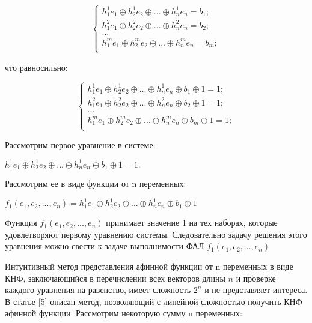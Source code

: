 \documentclass[12pt]{article}
\begin{document}
\[
\begin{cases}
h_{1}^{1}e_{1}\oplus h_{2}^{1}e_{2}\oplus ... \oplus h_{n}^{1}e_{n} = b_{1};  \\
h_{1}^{2}e_{1}\oplus h_{2}^{2}e_{2}\oplus ... \oplus h_{n}^{2}e_{n} = b_{2};  \\
\dots \\
h_{1}^{m}e_{1}\oplus h_{2}^{m}e_{2}\oplus ... \oplus h_{n}^{m}e_{n} = b_{m};  \\
\end{cases}
\]

что равносильно:

\[
\begin{cases}
h_{1}^{1}e_{1}\oplus h_{2}^{1}e_{2}\oplus ... \oplus h_{n}^{1}e_{n} \oplus b_{1}
\oplus 1 = 1;  \\
h_{1}^{2}e_{1}\oplus h_{2}^{2}e_{2}\oplus ... \oplus h_{n}^{2}e_{n} \oplus b_{2} \oplus 1 = 1;  \\
\dots \\
h_{1}^{m}e_{1}\oplus h_{2}^{m}e_{2}\oplus ... \oplus h_{n}^{m}e_{n} \oplus b_{m} \oplus 1 = 1;  \\
\end{cases}
\]

Рассмотрим первое уравнение в системе:

\begin{center}
$h_{1}^{1}e_{1}\oplus h_{2}^{1}e_{2}\oplus ... \oplus h_{n}^{1}e_{n} \oplus b_{1}
\oplus 1 = 1.$
\end{center}

Рассмотрим ее в виде функции от n переменных:

\begin{center}
$f_{1}(e_{1},e_{2},...,e_{n}) = h_{1}^{1}e_{1}\oplus h_{2}^{1}e_{2}\oplus ... \oplus h_{n}^{1}e_{n} \oplus b_{1}
\oplus 1$
\end{center}

Функция $f_{1}(e_{1},e_{2},...,e_{n})$ принимает значение 1 на тех наборах, которые удовлетворяют первому уравнению системы. Следовательно задачу решения этого уравнения можно свести к задаче выполнимости ФАЛ $f_{1}(e_{1},e_{2},...,e_{n})$

Интуитивный метод представления афинной функции от n переменных в виде КНФ, заключающийся в перечислении всех векторов длины $n$ и проверке каждого уравнения на равенство, имеет сложность $2^{n}$ и не представляет интереса. В статье [5] описан метод, позволяющий с линейной сложностью получить КНФ афинной функции. Рассмотрим некоторую сумму n переменных:
\end{document}
